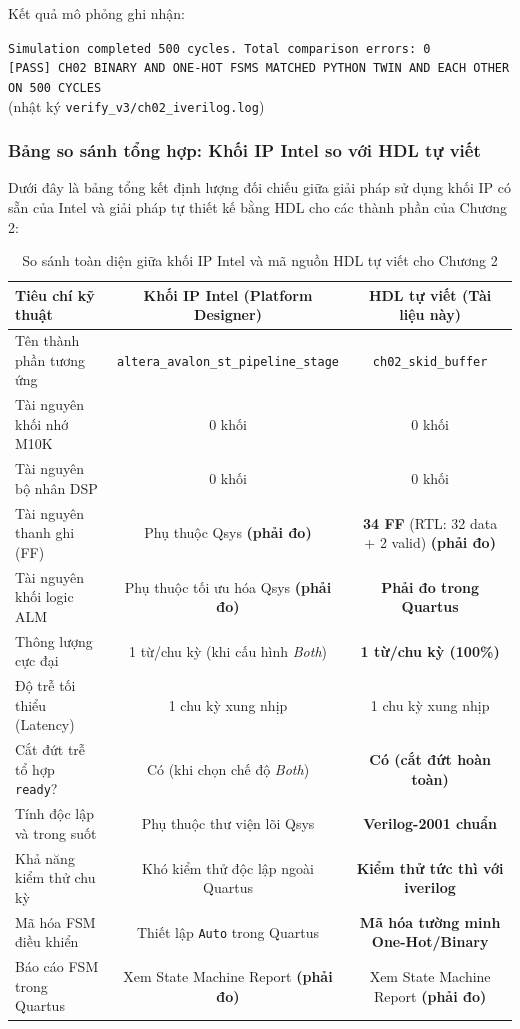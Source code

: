 Kết quả mô phỏng ghi nhận:
\begin{center}
\small\texttt{Simulation completed 500 cycles. Total comparison errors: 0}\\
\small\texttt{[PASS] CH02 BINARY AND ONE-HOT FSMS MATCHED PYTHON TWIN AND EACH OTHER ON 500 CYCLES}\\
\footnotesize(nhật ký \texttt{verify\_v3/ch02\_iverilog.log})
\end{center}

\subsubsection*{Bảng so sánh tổng hợp: Khối IP Intel so với HDL tự viết}
Dưới đây là bảng tổng kết định lượng đối chiếu giữa giải pháp sử dụng khối IP có sẵn của Intel và giải pháp tự thiết kế bằng HDL cho các thành phần của Chương 2:

\begin{table}[htbp]
\centering
\footnotesize
\setlength{\tabcolsep}{4.5pt}
\caption{So sánh toàn diện giữa khối IP Intel và mã nguồn HDL tự viết cho Chương 2}
\label{tab:ch02_ip_vs_hdl}
\begin{tabular}{lcc}
\toprule
Tiêu chí kỹ thuật & Khối IP Intel (Platform Designer) & HDL tự viết (Tài liệu này) \\
\midrule
Tên thành phần tương ứng & \texttt{altera\_avalon\_st\_pipeline\_stage} & \texttt{ch02\_skid\_buffer} \\
Tài nguyên khối nhớ M10K & 0 khối & 0 khối \\
Tài nguyên bộ nhân DSP & 0 khối & 0 khối \\
Tài nguyên thanh ghi (FF) & Phụ thuộc Qsys \textbf{(phải đo)} & \textbf{34 FF} (RTL: 32 data + 2 valid) \textbf{(phải đo)} \\
Tài nguyên khối logic ALM & Phụ thuộc tối ưu hóa Qsys \textbf{(phải đo)} & \textbf{Phải đo trong Quartus} \\
Thông lượng cực đại & 1 từ/chu kỳ (khi cấu hình \emph{Both}) & \textbf{1 từ/chu kỳ (100\%)} \\
Độ trễ tối thiểu (Latency) & 1 chu kỳ xung nhịp & 1 chu kỳ xung nhịp \\
Cắt đứt trễ tổ hợp \texttt{ready}? & Có (khi chọn chế độ \emph{Both}) & \textbf{Có (cắt đứt hoàn toàn)} \\
Tính độc lập và trong suốt & Phụ thuộc thư viện lõi Qsys & \textbf{Verilog-2001 chuẩn} \\
Khả năng kiểm thử chu kỳ & Khó kiểm thử độc lập ngoài Quartus & \textbf{Kiểm thử tức thì với iverilog} \\
Mã hóa FSM điều khiển & Thiết lập \texttt{Auto} trong Quartus & \textbf{Mã hóa tường minh One-Hot/Binary} \\
Báo cáo FSM trong Quartus & Xem State Machine Report \textbf{(phải đo)} & Xem State Machine Report \textbf{(phải đo)} \\
\bottomrule
\end{tabular}
\end{table}

